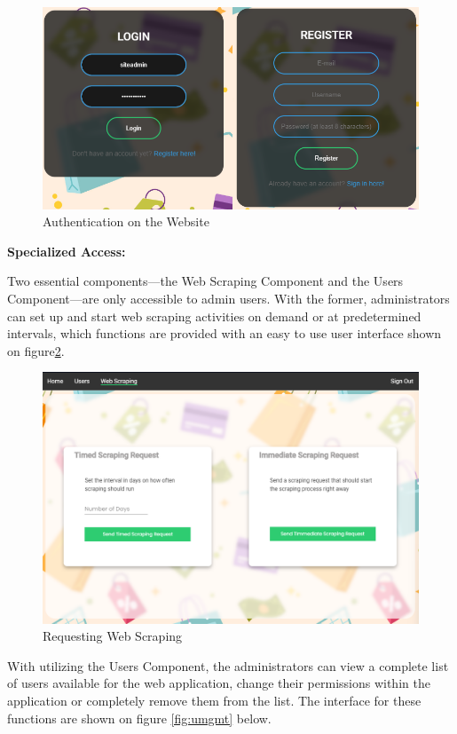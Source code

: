 \begin{figure}[H]
	\centering
	\includegraphics[width=0.7\linewidth]{img/auth_web_ss.png}
	\caption{Authentication on the Website}
	\label{fig:auth}
\end{figure}

\noindent\textbf{Specialized Access:}

Two essential components—the Web Scraping Component and the Users Component—are only accessible to admin users. With the former, administrators can set up and start web scraping activities on demand or at predetermined intervals, which functions are provided with an easy to use user interface shown on figure\ref{fig:webcrapingreq}.
\begin{figure}[H]
	\centering
	\includegraphics[width=0.9\linewidth]{img/scraping_web_ss.png}
	\caption{Requesting Web Scraping}
	\label{fig:webcrapingreq}
\end{figure}

\newpage

With utilizing the Users Component, the administrators can view a complete list of users available for the web application, change their permissions within the application or completely remove them from the list. The interface for these functions are shown on figure \ref{fig:umgmt} below.

